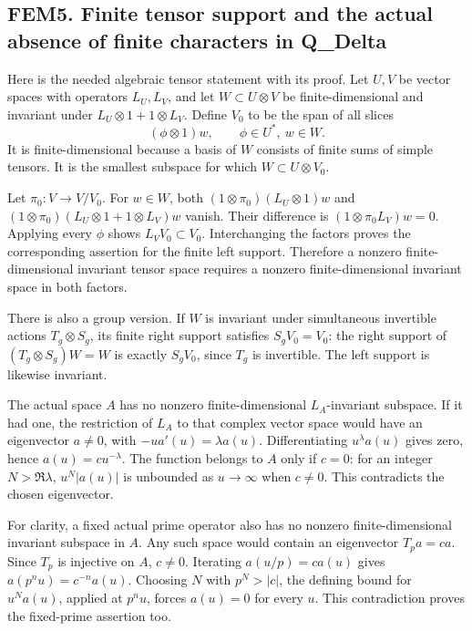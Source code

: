 \subsection{FEM5. Finite tensor support and the actual absence of finite
characters in
Q\_Delta}\label{fem5.-finite-tensor-support-and-the-actual-absence-of-finite-characters-in-q_delta}

Here is the needed algebraic tensor statement with its proof. Let
\(U,V\) be vector spaces with operators \(L_U,L_V\), and let
\(W\subset U\otimes V\) be finite-dimensional and invariant under
\(L_U\otimes1+1\otimes L_V\). Define \(V_0\) to be the span of all
slices \[
(\phi\otimes1)w,\qquad \phi\in U^*,\ w\in W .
\] It is finite-dimensional because a basis of \(W\) consists of finite
sums of simple tensors. It is the smallest subspace for which
\(W\subset U\otimes V_0\).

Let \(\pi_0:V\to V/V_0\). For \(w\in W\), both
\((1\otimes\pi_0)(L_U\otimes1)w\) and
\((1\otimes\pi_0)(L_U\otimes1+1\otimes L_V)w\) vanish. Their difference
is \((1\otimes\pi_0L_V)w=0\). Applying every \(\phi\) shows
\(L_VV_0\subset V_0\). Interchanging the factors proves the
corresponding assertion for the finite left support. Therefore a nonzero
finite-dimensional invariant tensor space requires a nonzero
finite-dimensional invariant space in both factors.

There is also a group version. If \(W\) is invariant under simultaneous
invertible actions \(T_g\otimes S_g\), its finite right support
satisfies \(S_gV_0=V_0\): the right support of \((T_g\otimes S_g)W=W\)
is exactly \(S_gV_0\), since \(T_g\) is invertible. The left support is
likewise invariant.

The actual space \(A\) has no nonzero finite-dimensional
\(L_A\)-invariant subspace. If it had one, the restriction of \(L_A\) to
that complex vector space would have an eigenvector \(a\ne0\), with
\(-ua'(u)=\lambda a(u)\). Differentiating \(u^\lambda a(u)\) gives zero,
hence \(a(u)=c u^{-\lambda}\). The function belongs to \(A\) only if
\(c=0\): for an integer \(N>\Re\lambda\), \(u^N|a(u)|\) is unbounded as
\(u\to\infty\) when \(c\ne0\). This contradicts the chosen eigenvector.

For clarity, a fixed actual prime operator also has no nonzero
finite-dimensional invariant subspace in \(A\). Any such space would
contain an eigenvector \(T_pa=c a\). Since \(T_p\) is injective on
\(A\), \(c\ne0\). Iterating \(a(u/p)=c a(u)\) gives
\(a(p^nu)=c^{-n}a(u)\). Choosing \(N\) with \(p^N>|c|\), the defining
bound for \(u^Na(u)\), applied at \(p^nu\), forces \(a(u)=0\) for every
\(u\). This contradiction proves the fixed-prime assertion too.

